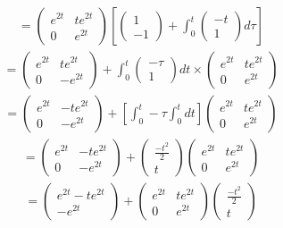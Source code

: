 \documentclass[a4paper, 12pt]{article}
\begin{document}
\begin{align*}
= 
\begin{pmatrix}
e^{2t} & te^{2t} \\
0 & e^{2t}
\end{pmatrix}
\left[
\begin{pmatrix}
1 \\
-1
\end{pmatrix} + \int_{0}^{t}
\begin{pmatrix}
-t \\
1 
\end{pmatrix}  d \tau
\right]
\end{align*}
\begin{align*}
=
\begin{pmatrix}
e^{2t} & te^{2t} \\
0 & -e^{2t} 
\end{pmatrix} + 
\int_{0}^{t} 
\begin{pmatrix}
- \tau \\
1 
\end{pmatrix} dt \times
\begin{pmatrix}
e^{2t} & te^{2t} \\
0 & e^{2t}
\end{pmatrix}
\end{align*}
\begin{align*}
=
\begin{pmatrix}
e^{2t} & -te^{2t} \\
0 & -e^{2t} 
\end{pmatrix} + 
\left[\int_{0}^{t} - \tau \int_{0}^{t} dt\right] \begin{pmatrix}
e^{2t} & te^{2t} \\
0 & e^{2t}
\end{pmatrix}
\end{align*}
\begin{align*}
=
\begin{pmatrix}
e^{2t} & -te^{2t} \\
0 & -e^{2t}
\end{pmatrix} +  
\begin{pmatrix}
\frac{-t^2}{2} \\
t
\end{pmatrix}
\begin{pmatrix}
e^{2t} & te^{2t} \\
0 & e^{2t}
\end{pmatrix}
\end{align*}
\begin{align*}
=
\begin{pmatrix}
e^{2t} - te^{2t} \\
-e^{2t}
\end{pmatrix} +
\begin{pmatrix}
e^{2t} & te^{2t} \\
0 & e^{2t} 
\end{pmatrix}
\begin{pmatrix}
\frac{-t^2}{2}\\
t
\end{pmatrix}
\end{align*}
\end{document}
